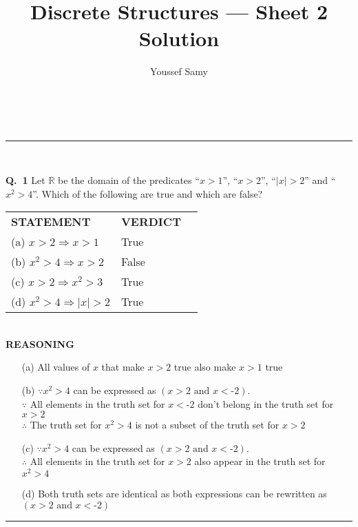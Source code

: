 \documentclass[a4paper,12pt]{article}
\makeatletter
\newcommand{\linia}{\rule{\linewidth}{0.5pt}}
\renewcommand{\maketitle}{
\begin{center}
\vspace{2ex}
{\huge \textbf{\@title}}
\vspace{1ex}
\\
\linia\\
\textsf{\@date \hfill
\@author}
\vspace{4ex}
\end{center}
}
\newcommand{\sz}{\text{-}}
\makeatother
\begin{document}
\title{Discrete Structures --- Sheet 2 Solution}
\author{Youssef Samy}
\maketitle
\fontsize{14}{16}\selectfont

\noindent \textbf{Q.~1} Let $\mathbb{R}$ be the domain of the predicates ``$x > 1$'', ``$x>2$'', ``$|x|>2$'' and ``$x^2 > 4$''. Which of the following are true and which are false?\\

\bgroup
\def\arraystretch{1.5}
{
    \begin{tabular}{l|l l}
        \textbf{STATEMENT}              & \textbf{VERDICT} \\
        (a) $x>2 \Rightarrow x > 1$     & True             \\
        (b) $x^2 > 4 \Rightarrow x > 2$ & False            \\
        (c) $x>2 \Rightarrow x^2 > 3$   & True             \\
        (d) $x^2>4 \Rightarrow |x| > 2$ & True
    \end{tabular}}
\egroup
\ \\

\textbf{REASONING}
\begin{itemize}
    \item[(a)] All values of $x$ that make $x>2$ true also make $x>1$ true
    \item[(b)] $\because x^2 > 4$ can be expressed as $(x > 2 \text{ and } x<\sz2)$.\\
          $\because$ All elements in the truth set for $x<\sz2$ don't belong in the truth set for $x>2$\\
          $\therefore$ The truth set for $x^2 >4$ is not a subset of the truth set for $x > 2$
    \item[(c)] $\because x^2 > 4$ can be expressed as $(x > 2 \text{ and } x<\sz2)$.\\
          $\therefore$ All elements in the truth set for $x>2$ also appear in the truth set for $x^2>4$
    \item[(d)] Both truth sets are identical as both expressions can be rewritten as $(x > 2 \text{ and } x<\sz2)$
\end{itemize}

\begin{center}
    \rule{6cm}{0.4pt}
\end{center}
\end{document}
